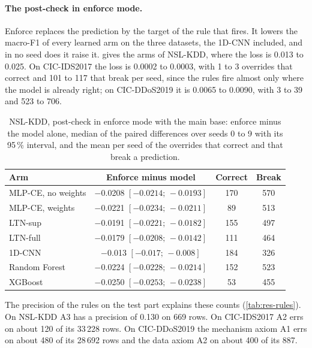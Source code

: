 \paragraph{The post-check in enforce mode.}
Enforce replaces the prediction by the target of the rule that fires. It lowers the macro-F1 of every learned arm on
the three datasets, the 1D-CNN included, and in no seed does it raise it.  gives the arms of
NSL-KDD, where the loss is 0.013 to 0.025. On CIC-IDS2017 the loss is 0.0002 to 0.0003, with 1 to 3 overrides that
correct and 101 to 117 that break per seed, since the rules fire almost only where the model is already right; on
CIC-DDoS2019 it is 0.0065 to 0.0090, with 3 to 39 and 523 to 706.

\begin{table}[t]
\centering
\footnotesize
\caption{NSL-KDD, post-check in enforce mode with the main base: enforce minus the model alone, median of the paired
differences over seeds 0 to 9 with its 95\,\% interval, and the mean per seed of the overrides that correct and that
break a prediction.}
\label{tab:res-postcheck}
\setlength{\tabcolsep}{4pt}
\begin{tabular}{@{}lccc@{}}
\toprule
Arm & Enforce minus model & Correct & Break \\
\midrule
MLP-CE, no weights & $-$0.0208 $[-0.0214;\,-0.0193]$ & 170 & 570 \\
MLP-CE, weights    & $-$0.0221 $[-0.0234;\,-0.0211]$ & 89  & 513 \\
LTN-sup            & $-$0.0191 $[-0.0221;\,-0.0182]$ & 155 & 497 \\
LTN-full           & $-$0.0179 $[-0.0208;\,-0.0142]$ & 111 & 464 \\
1D-CNN             & $-$0.013 $[-0.017;\,-0.008]$     & 184 & 326 \\
Random Forest      & $-$0.0224 $[-0.0228;\,-0.0214]$ & 152 & 523 \\
XGBoost            & $-$0.0250 $[-0.0253;\,-0.0238]$ & 53  & 455 \\
\bottomrule
\end{tabular}
\end{table}

The precision of the rules on the test part explains these counts (\cref{tab:res-rules}). On NSL-KDD A3 has a
precision of 0.130 on 669 rows. On CIC-IDS2017 A2 errs on about 120 of its 33\,228 rows. On CIC-DDoS2019 the mechanism
axiom A1 errs on about 480 of its 28\,692 rows and the data axiom A2 on about 400 of its 887.

